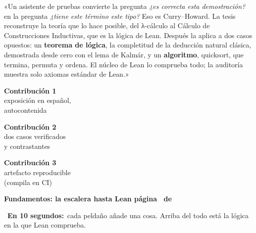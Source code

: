 \documentclass[12pt]{article}
\newcommand{\encabezado}[4]{%
  \begin{tcolorbox}[colback=#1, colframe=#1, arc=5pt, boxrule=0pt,
      left=10pt, right=10pt, top=5pt, bottom=5pt, after skip=4pt]
    \color{white}\LARGE #2\quad\bfseries #3\hfill
    \normalfont\large página \thepage\ de \pageref{LastPage}
  \end{tcolorbox}
  \begin{tcolorbox}[colback=tldr, colframe=#1, boxrule=0.8pt, arc=4pt,
      left=10pt, right=10pt, top=4pt, bottom=4pt, after skip=8pt]
    \large\faBolt\ \textbf{En 10 segundos:}\ #4
  \end{tcolorbox}}
\begin{document}
\vspace{4pt}
\begin{tcolorbox}[colback=white, colframe=black!70, boxrule=1.2pt, arc=6pt,
  title={\faMicrophone\ Dilo así (en voz alta, dos veces)}, colbacktitle=black!70,
  fonttitle=\bfseries\large]
\large
«Un asistente de pruebas convierte la pregunta \emph{¿es correcta esta
demostración?} en la pregunta \emph{¿tiene este término este tipo?} Eso es
Curry–Howard. La tesis reconstruye la teoría que lo hace posible, del λ-cálculo
al Cálculo de Construcciones Inductivas, que es la lógica de Lean. Después la
aplica a dos casos opuestos: un \textbf{teorema de lógica}, la completitud de la
deducción natural clásica, demostrada desde cero con el lema de Kalmár, y un
\textbf{algoritmo}, quicksort, que termina, permuta y ordena. El núcleo de Lean
lo comprueba todo; la auditoría muestra solo axiomas estándar de Lean.»
\end{tcolorbox}

\vfill
\begin{tcbraster}[raster columns=3, raster column skip=8pt, raster equal height]
\begin{tcolorbox}[colback=fund!10, colframe=fund, arc=4pt, halign=center]\large\textbf{Contribución 1}\\ exposición en español,\\ autocontenida\end{tcolorbox}
\begin{tcolorbox}[colback=comp!10, colframe=comp, arc=4pt, halign=center]\large\textbf{Contribución 2}\\ dos casos verificados\\ y contrastantes\end{tcolorbox}
\begin{tcolorbox}[colback=conf!10, colframe=conf, arc=4pt, halign=center]\large\textbf{Contribución 3}\\ artefacto reproducible\\ (compila en CI)\end{tcolorbox}
\end{tcbraster}

\newpage
\encabezado{fund}{\faCubes}{Fundamentos: la escalera hasta Lean}{cada peldaño
añade una cosa. Arriba del todo está la lógica en la que Lean comprueba.}
\end{document}
